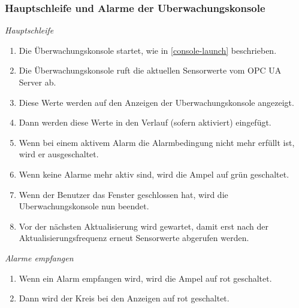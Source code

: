 \documentclass[parskip=full]{scrartcl}
\begin{document}
\subsubsection{Hauptschleife und Alarme der \gls{Uberwachungskonsole}}
\emph{Hauptschleife}
\begin{enumerate}[noitemsep]
 \item Die Überwachungskonsole startet, wie in \ref{console-launch} beschrieben.
 \item Die Überwachungskonsole ruft die aktuellen Sensorwerte vom \gls{OPC UA Server} ab.
 \item Diese Werte werden auf den Anzeigen der \gls{Uberwachungskonsole} angezeigt.
 \item Dann werden diese Werte in den Verlauf (sofern aktiviert) eingefügt.
 \item Wenn bei einem aktivem Alarm die Alarmbedingung nicht mehr erfüllt ist, wird er ausgeschaltet.
 \item Wenn keine Alarme mehr aktiv sind, wird die Ampel auf grün geschaltet.
 \item Wenn der Benutzer das Fenster geschlossen hat, wird die \gls{Uberwachungskonsole} nun beendet.
 \item Vor der nächsten Aktualisierung wird gewartet, damit erst nach der Aktualisierungsfrequenz erneut Sensorwerte abgerufen werden.
\end{enumerate}
\emph{Alarme empfangen}
\begin{enumerate}[noitemsep]
 \item Wenn ein Alarm empfangen wird, wird die Ampel auf rot geschaltet.
 \item Dann wird der Kreis bei den Anzeigen auf rot geschaltet.
\end{enumerate}
\end{document}
